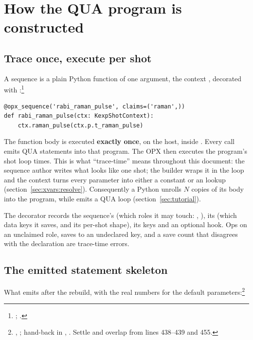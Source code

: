 \section{How the QUA program is constructed}
\label{sec:program}

\subsection{Trace once, execute per shot}

A sequence is a plain Python function of one argument, the context
, decorated with :\footnote{;
.}

\begin{lstlisting}[style=py]
@opx_sequence('rabi_raman_pulse', claims=('raman',))
def rabi_raman_pulse(ctx: KexpShotContext):
    ctx.raman_pulse(ctx.p.t_raman_pulse)
\end{lstlisting}

The function body is executed \textbf{exactly once}, on the host, inside
. Every  call emits QUA statements into
that program. The OPX then executes the program's shot loop 
times. This is what ``trace-time'' means throughout this document: the
sequence author writes what looks like one shot; the builder wraps it in the
loop and the context turns every parameter into either a constant or an
 lookup (section~\ref{sec:xvars:resolve}). Consequently a
Python  unrolls $N$ copies of
its body into the program, while  emits a
QUA loop (section~\ref{sec:tutorial}).

The decorator records the sequence's  (which roles it may touch:
, ), its  (which data keys it
saves, and its per-shot shape), its  keys and an optional
 hook. Ops on an unclaimed role, saves
to an undeclared key, and a save count that disagrees with the declaration
are trace-time errors.

\subsection{The emitted statement skeleton}
\label{sec:program:skeleton}

What  emits after the rebuild, with the real
numbers for the default parameters:\footnote{,
; hand-back in , .
Settle and overlap from  lines
438--439 and 455.}

